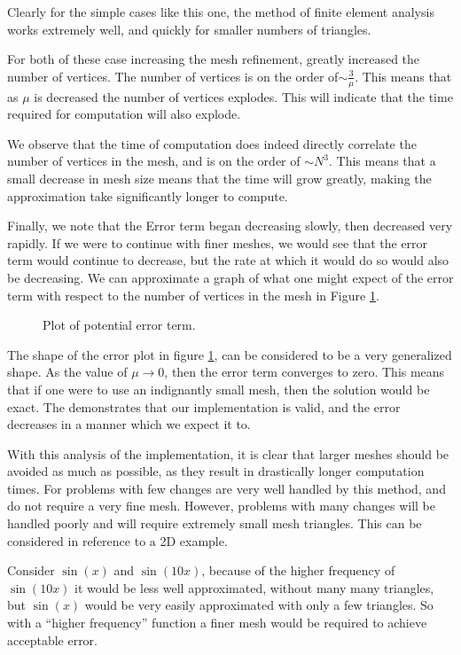 \documentclass[../fem.tex]{subfile}
\begin{document}
Clearly for the simple cases like this one, the method of finite element
analysis works extremely well, and quickly for smaller numbers of triangles.

For both of these case increasing the mesh refinement, greatly increased the
number of vertices. The number of vertices is on the order
of$\sim\frac{3}{\mu}$. This means that as $\mu$ is decreased the number of
vertices explodes. This will indicate that the time required for computation
will also explode.

We observe that the time of computation does indeed directly correlate the
number of vertices in the mesh, and is on the order of $\sim N^3$. This means
that a small decrease in mesh size means that the time will grow greatly,
making the approximation take significantly longer to compute.

Finally, we note that the Error term began decreasing slowly, then decreased
very rapidly. If we were to continue with finer meshes, we would see that the
error term would continue to decrease, but the rate at which it would do so
would also be decreasing. We can approximate a graph of what one might expect
of the error term with respect to the number of vertices in the mesh in Figure
\ref{fig:error_decrease}.

\begin{figure}[htpb]
\begin{center}
\end{center}
\caption{Plot of potential error term.}
\label{fig:error_decrease}
\end{figure}

The shape of the error plot in figure \ref{fig:error_decrease}, can be
considered to be a very generalized shape. As the value of $\mu\rightarrow 0$,
then the error term converges to zero. This means that if one were to use an
indignantly small mesh, then the solution would be exact. The demonstrates that
our implementation is valid, and the error decreases in a manner which we
expect it to.

With this analysis of the implementation, it is clear that larger meshes should
be avoided as much as possible, as they result in drastically longer computation
times. For problems with few changes are very well handled by this method, and
do not require a very fine mesh. However, problems with many changes will be
handled poorly and will require extremely small mesh triangles. This can be
considered in reference to a 2D example.

Consider $\sin(x)$ and $\sin(10x)$, because of the higher frequency of
$\sin(10x)$ it would be less well approximated, without many many triangles,
but $\sin(x)$ would be very easily approximated with only a few triangles. So
with a ``higher frequency'' function a finer mesh would be required to achieve
acceptable error.
\end{document}
